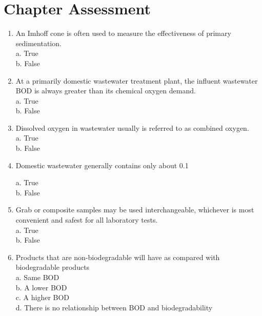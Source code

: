 \section*{Chapter Assessment}
\begin{tcolorbox}[breakable, enhanced,
colframe=blue!25,
colback=blue!10,
coltitle=blue!20!black,  
title= Chapter Assessment]

\begin{enumerate}

\item  An Imhoff cone is often used to measure the effectiveness of primary sedimentation. \\

a. True \\
b. False 

\item  At a primarily domestic wastewater treatment plant, the influent wastewater BOD is always greater than its chemical oxygen demand. \\

a. True \\
b. False 

\item  Dissolved oxygen in wastewater usually is referred to as combined oxygen. \\

a. True \\
b. False 

\item  Domestic wastewater generally contains only about 0.1%

a. True \\
b. False 

\item  Grab or composite samples may be used interchangeable, whichever is most convenient and safest for all laboratory tests. \\

a. True \\
b. False 

\item Products that are non-biodegradable will have {\underline{\hspace{1cm}}} as compared with biodegradable products \\

a. Same BOD \\
b. A lower BOD \\
c. A higher BOD \\
d. There is no relationship between BOD and biodegradability 


\end{enumerate}
\end{tcolorbox}
